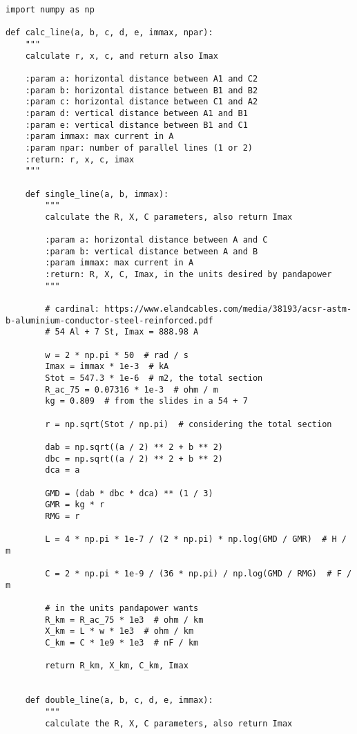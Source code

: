 \begin{lstlisting}[caption={Code for the calculation of lines}]
import numpy as np

def calc_line(a, b, c, d, e, immax, npar):
    """
    calculate r, x, c, and return also Imax

    :param a: horizontal distance between A1 and C2
    :param b: horizontal distance between B1 and B2
    :param c: horizontal distance between C1 and A2
    :param d: vertical distance between A1 and B1
    :param e: vertical distance between B1 and C1
    :param immax: max current in A
    :param npar: number of parallel lines (1 or 2)
    :return: r, x, c, imax
    """

    def single_line(a, b, immax):
        """
        calculate the R, X, C parameters, also return Imax

        :param a: horizontal distance between A and C
        :param b: vertical distance between A and B
        :param immax: max current in A
        :return: R, X, C, Imax, in the units desired by pandapower
        """

        # cardinal: https://www.elandcables.com/media/38193/acsr-astm-b-aluminium-conductor-steel-reinforced.pdf
        # 54 Al + 7 St, Imax = 888.98 A

        w = 2 * np.pi * 50  # rad / s
        Imax = immax * 1e-3  # kA
        Stot = 547.3 * 1e-6  # m2, the total section
        R_ac_75 = 0.07316 * 1e-3  # ohm / m
        kg = 0.809  # from the slides in a 54 + 7

        r = np.sqrt(Stot / np.pi)  # considering the total section

        dab = np.sqrt((a / 2) ** 2 + b ** 2)
        dbc = np.sqrt((a / 2) ** 2 + b ** 2)
        dca = a

        GMD = (dab * dbc * dca) ** (1 / 3)
        GMR = kg * r
        RMG = r

        L = 4 * np.pi * 1e-7 / (2 * np.pi) * np.log(GMD / GMR)  # H / m

        C = 2 * np.pi * 1e-9 / (36 * np.pi) / np.log(GMD / RMG)  # F / m

        # in the units pandapower wants
        R_km = R_ac_75 * 1e3  # ohm / km
        X_km = L * w * 1e3  # ohm / km
        C_km = C * 1e9 * 1e3  # nF / km

        return R_km, X_km, C_km, Imax


    def double_line(a, b, c, d, e, immax):
        """
        calculate the R, X, C parameters, also return Imax


\end{lstlisting}
